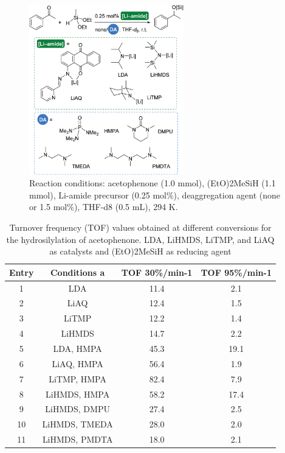 \documentclass[journal=jacsat,manuscript=article]{achemso}
\begin{document}
	\begin{figure}[H]
		\includegraphics[width=0.6\textwidth]{figures/Reaction.PNG}		
		\centering
		\caption{Reaction conditions: acetophenone (1.0 mmol), (EtO)2MeSiH (1.1 mmol), Li-amide precursor (0.25 mol\%), deaggregation
			agent (none or 1.5 mol\%), THF-d8 (0.5 mL), 294 K.}
		\label{Scheme5}
	\end{figure}
	
	\begin{table}
		\caption{Turnover frequency (TOF) values obtained at different conversions for the hydrosilylation of acetophenone. LDA, LiHMDS, LiTMP, and LiAQ as catalysts and (EtO)2MeSiH as reducing agent}
		\begin{tabular}{|c|c|c|c}
			\hline
			Entry & Conditions a & TOF 30\%/min-1 & TOF 95\%/min-1 \\
			\hline
			1 & LDA & 11.4 & 2.1 \\
			\hline
			2 & LiAQ & 12.4 & 1.5 \\
			\hline
			3 & LiTMP & 12.2 & 1.4 \\
			\hline
			4 & LiHMDS & 14.7 & 2.2 \\
			\hline
			5 & LDA, HMPA & 45.3 & 19.1 \\
			\hline
			6 & LiAQ, HMPA & 56.4 & 1.9 \\
			\hline
			7 & LiTMP, HMPA & 82.4 & 7.9 \\
			\hline
			8 & LiHMDS, HMPA & 58.2 & 17.4 \\
			\hline
			9 & LiHMDS, DMPU & 27.4 & 2.5 \\
			\hline
			10 & LiHMDS, TMEDA & 28.0 & 2.0 \\
			\hline
			11 & LiHMDS, PMDTA & 18.0 & 2.1 \\
			\hline
		\end{tabular}
	\end{table}
	
\end{document}
